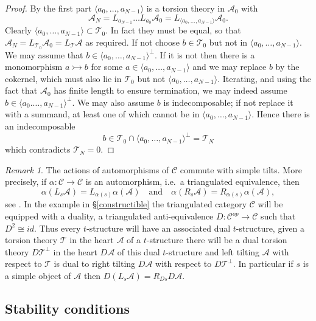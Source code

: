 \documentclass{article}
\theoremstyle{plain}
\theoremstyle{definition}
\theoremstyle{remark}
\newtheorem{remark}[theorem]{Remark}
\newcommand{\ie}{i.e.\ }
\newcommand{\cat}[1]{\mathcal{#1}}
\newcommand{\id}{id}
\begin{document}
\begin{proof}
By the first part $\langle a_0,\ldots,a_{N-1} \rangle$ is a torsion theory in $\cat{A}_0$ with 
$$
\cat{A}_N=L_{a_{N-1}}\ldots L_{a_0}\cat{A}_0=L_{\langle a_0,\ldots,a_{N-1}\rangle}\cat{A}_0.
$$
Clearly $\langle a_0,\ldots,a_{N-1}\rangle \subset \cat{T}_0$. In fact they must be equal, so that $\cat{A}_N=L_{\cat{T}_0}\cat{A}_0=L_\cat{T}\cat{A}$ as required. If not choose $b\in \cat{T}_0$ but not in $\langle a_0,\ldots,a_{N-1}\rangle$. We may assume that $b \in \langle a_0,\ldots,a_{N-1}\rangle ^\perp$. If it is not then there is a monomorphism $a \rightarrowtail b$ for some $a\in \langle a_0,\ldots,a_{N-1}\rangle $ and we may replace $b$ by the cokernel, which must also lie in $\cat{T}_0$ but not $\langle a_0,\ldots,a_{N-1}\rangle$. Iterating, and using the fact that $\cat{A}_0$ has finite length to ensure termination, we may indeed assume $b \in \langle a_0.\ldots,a_{N-1}\rangle^\perp$. We may also assume $b$ is indecomposable; if not replace it with a summand, at least one of which cannot be in $\langle a_0,\ldots,a_{N-1}\rangle$. Hence there is an indecomposable
$$
b \in \cat{T}_0 \cap \langle a_0,\ldots,a_{N-1}\rangle^\perp = \cat{T}_N
$$
which contradicts $\cat{T}_N=0$.
\end{proof}


\begin{remark}
The actions of automorphisms of $\cat{C}$ commute with simple tilts. More precisely, if $\alpha: \cat{C} \to \cat{C}$ is an automorphism, \ie a triangulated equivalence, then 
$$
\alpha( L_s\cat{A} ) = L_{\alpha(s)}\alpha(\cat{A}) \quad \textrm{and} \quad \alpha( R_s\cat{A} ) = R_{\alpha(s)}\alpha(\cat{A}),
$$
see \cite[Lemma 8.2]{MR2373143}. In the example in \S\ref{constructible} the triangulated category $\cat{C}$ will be equipped with a duality, a triangulated anti-equivalence $D: \cat{C}^{op}\to \cat{C}$ such that $D^2\cong \id$. Thus every $t$-structure will have an associated dual $t$-structure, given a torsion theory $\cat{T}$  in the heart $\cat{A}$ of a $t$-structure there will be a dual torsion theory $D\cat{T}^\perp$ in the heart $D\cat{A}$ of this dual $t$-structure and left tilting $\cat{A}$ with respect to $\cat{T}$ is dual to right tilting $D\cat{A}$ with respect to $D\cat{T}^\perp$. In particular if $s$ is a simple object of $\cat{A}$ then $D(L_s\cat{A}) = R_{Ds}D\cat{A}$.
\end{remark}




\subsection{Stability conditions}
\label{stability conditions}
\end{document}
